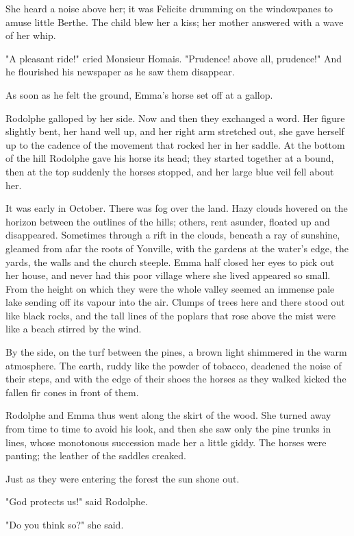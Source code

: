\documentclass[11pt,twocolumn]{ltugboat}
\begin{document}
She heard a noise above her; it was Felicite drumming on the windowpanes
to amuse little Berthe. The child blew her a kiss; her mother answered
with a wave of her whip.

"A pleasant ride!" cried Monsieur Homais. "Prudence! above all,
prudence!" And he flourished his newspaper as he saw them disappear.

As soon as he felt the ground, Emma's horse set off at a gallop.

Rodolphe galloped by her side. Now and then they exchanged a word. Her
figure slightly bent, her hand well up, and her right arm stretched out,
she gave herself up to the cadence of the movement that rocked her in
her saddle. At the bottom of the hill Rodolphe gave his horse its head;
they started together at a bound, then at the top suddenly the horses
stopped, and her large blue veil fell about her.

It was early in October. There was fog over the land. Hazy clouds
hovered on the horizon between the outlines of the hills; others, rent
asunder, floated up and disappeared. Sometimes through a rift in the
clouds, beneath a ray of sunshine, gleamed from afar the roots of
Yonville, with the gardens at the water's edge, the yards, the walls and
the church steeple. Emma half closed her eyes to pick out her house, and
never had this poor village where she lived appeared so small. From the
height on which they were the whole valley seemed an immense pale lake
sending off its vapour into the air. Clumps of trees here and there
stood out like black rocks, and the tall lines of the poplars that rose
above the mist were like a beach stirred by the wind.

By the side, on the turf between the pines, a brown light shimmered
in the warm atmosphere. The earth, ruddy like the powder of tobacco,
deadened the noise of their steps, and with the edge of their shoes the
horses as they walked kicked the fallen fir cones in front of them.

Rodolphe and Emma thus went along the skirt of the wood. She turned
away from time to time to avoid his look, and then she saw only the pine
trunks in lines, whose monotonous succession made her a little giddy.
The horses were panting; the leather of the saddles creaked.

Just as they were entering the forest the sun shone out.

"God protects us!" said Rodolphe.

"Do you think so?" she said.
\end{document}
